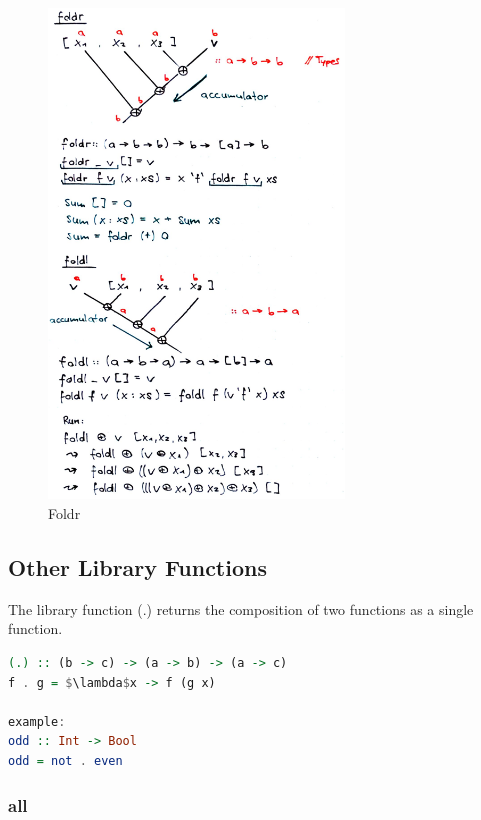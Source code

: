 \begin{figure}[H]
\centering
\includegraphics[width=0.7\textwidth]{figures/foldr.png}
\caption{Foldr}
\end{figure}

\hypertarget{other-library-functions}{%
\subsection{Other Library Functions}\label{other-library-functions}}

The library function (.) returns the composition of two functions as a
single function.

\begin{lstlisting}[language=Haskell]
(.) :: (b -> c) -> (a -> b) -> (a -> c)
f . g = $\lambda$x -> f (g x)

example:
odd :: Int -> Bool
odd = not . even
\end{lstlisting}

\hypertarget{all}{%
\subsubsection{all}\label{all}}

